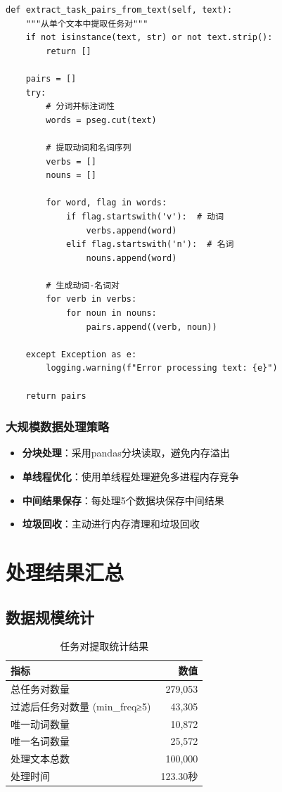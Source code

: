 \documentclass[11pt,a4paper]{article}
\begin{document}
\begin{lstlisting}[caption=任务对提取核心代码]
def extract_task_pairs_from_text(self, text):
    """从单个文本中提取任务对"""
    if not isinstance(text, str) or not text.strip():
        return []

    pairs = []
    try:
        # 分词并标注词性
        words = pseg.cut(text)

        # 提取动词和名词序列
        verbs = []
        nouns = []

        for word, flag in words:
            if flag.startswith('v'):  # 动词
                verbs.append(word)
            elif flag.startswith('n'):  # 名词
                nouns.append(word)

        # 生成动词-名词对
        for verb in verbs:
            for noun in nouns:
                pairs.append((verb, noun))

    except Exception as e:
        logging.warning(f"Error processing text: {e}")

    return pairs
\end{lstlisting}

\subsubsection{大规模数据处理策略}

\begin{itemize}
    \item \textbf{分块处理}：采用pandas分块读取，避免内存溢出
    \item \textbf{单线程优化}：使用单线程处理避免多进程内存竞争
    \item \textbf{中间结果保存}：每处理5个数据块保存中间结果
    \item \textbf{垃圾回收}：主动进行内存清理和垃圾回收
\end{itemize}

\section{处理结果汇总}

\subsection{数据规模统计}

\begin{table}[h]
\centering
\begin{tabular}{lr}
\toprule
\textbf{指标} & \textbf{数值} \\
\midrule
总任务对数量 & 279,053 \\
过滤后任务对数量 (min\_freq≥5) & 43,305 \\
唯一动词数量 & 10,872 \\
唯一名词数量 & 25,572 \\
处理文本总数 & 100,000 \\
处理时间 & 123.30秒 \\
\bottomrule
\end{tabular}
\caption{任务对提取统计结果}
\end{table}
\end{document}

